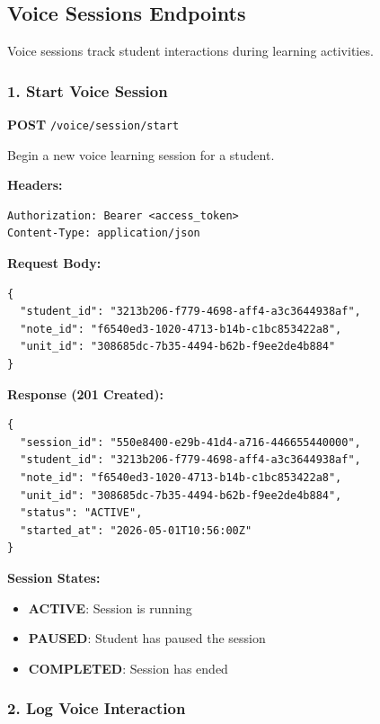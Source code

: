 \documentclass[12pt,a4paper,oneside]{article}
\begin{document}
\subsection{Voice Sessions Endpoints}

Voice sessions track student interactions during learning activities.

\subsubsection{1. Start Voice Session}

\textbf{POST} \texttt{/voice/session/start}

Begin a new voice learning session for a student.

\textbf{Headers:}
\begin{lstlisting}
Authorization: Bearer <access_token>
Content-Type: application/json
\end{lstlisting}

\textbf{Request Body:}
\begin{lstlisting}
{
  "student_id": "3213b206-f779-4698-aff4-a3c3644938af",
  "note_id": "f6540ed3-1020-4713-b14b-c1bc853422a8",
  "unit_id": "308685dc-7b35-4494-b62b-f9ee2de4b884"
}
\end{lstlisting}

\textbf{Response (201 Created):}
\begin{lstlisting}
{
  "session_id": "550e8400-e29b-41d4-a716-446655440000",
  "student_id": "3213b206-f779-4698-aff4-a3c3644938af",
  "note_id": "f6540ed3-1020-4713-b14b-c1bc853422a8",
  "unit_id": "308685dc-7b35-4494-b62b-f9ee2de4b884",
  "status": "ACTIVE",
  "started_at": "2026-05-01T10:56:00Z"
}
\end{lstlisting}

\textbf{Session States:}
\begin{itemize}
    \item \textbf{ACTIVE}: Session is running
    \item \textbf{PAUSED}: Student has paused the session
    \item \textbf{COMPLETED}: Session has ended
\end{itemize}

\subsubsection{2. Log Voice Interaction}
\end{document}
